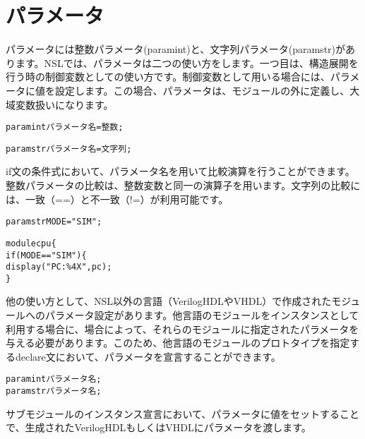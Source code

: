 \chapter{パラメータ}
\label{chap:parameter}

パラメータには整数パラメータ(param\textunderscore{}int)と、文字列パラメータ(param\textunderscore{}str)があります。NSLでは、パラメータは二つの使い方をします。一つ目は、構造展開を行う時の制御変数としての使い方です。制御変数として用いる場合には、パラメータに値を設定します。この場合、パラメータは、モジュールの外に定義し、大域変数扱いになります。

\begin{reviewemlist}
\begin{alltt}
param\textunderscore{}int パラメータ名 = 整数;

param\textunderscore{}str パラメータ名 = 文字列;
\end{alltt}
\end{reviewemlist}

if文の条件式において、パラメータ名を用いて比較演算を行うことができます。整数パラメータの比較は、整数変数と同一の演算子を用います。文字列の比較には、一致（==）と不一致（!=）が利用可能です。

\begin{reviewemlist}
\begin{alltt}
param\textunderscore{}str MODE = "SIM";

module cpu \{
 if(MODE == "SIM") \{
   \textunderscore{}display("PC: \%4X", pc);
 \}
\end{alltt}
\end{reviewemlist}

他の使い方として、NSL以外の言語（VerilogHDLやVHDL）で作成されたモジュールへのパラメータ設定があります。他言語のモジュールをインスタンスとして利用する場合に、場合によって、それらのモジュールに指定されたパラメータを与える必要があります。このため、他言語のモジュールのプロトタイプを指定するdeclare文において、パラメータを宣言することができます。

\begin{reviewemlist}
\begin{alltt}
param\textunderscore{}int パラメータ名;
param\textunderscore{}str パラメータ名;
\end{alltt}
\end{reviewemlist}

サブモジュールのインスタンス宣言において、パラメータに値をセットすることで、生成されたVerilogHDLもしくはVHDLにパラメータを渡します。

